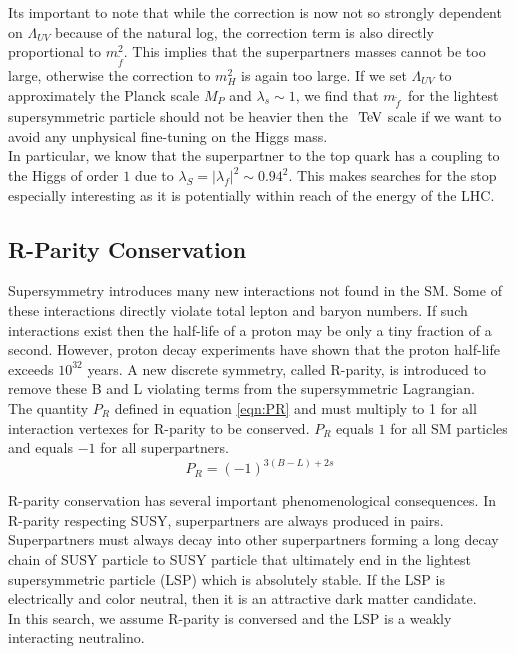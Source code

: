 \indent Its important to note that while the correction is now not so strongly dependent on $\Lambda_{UV}$ because of the natural log, the correction term is also directly proportional to $m_{\tilde{f}}^2$.  This implies that the superpartners masses cannot be too large, otherwise the correction to $m_H^2$ is again too large.  If we set $\Lambda_{UV}$ to approximately the Planck scale $M_P$ and $\lambda_s \sim 1$, we find that $m_{\tilde{f}}$~for the lightest supersymmetric particle should not be heavier then the $\tev$ scale if we want to avoid any unphysical fine-tuning on the Higgs mass.\cite{MartinSUSY}  \\

\indent In particular, we know that the superpartner to the top quark has a coupling to the Higgs of order $1$ due to $\lambda_S = |\lambda_f|^2 \sim 0.94^2$. This makes searches for the stop especially interesting as it is potentially within reach of the energy of the LHC. \\

\subsection{R-Parity Conservation}

\indent Supersymmetry introduces many new interactions not found in the SM.  Some of these interactions directly violate total lepton and baryon numbers.  If such interactions exist then the half-life of a proton may be only a tiny fraction of a second.  However, proton decay experiments have shown that the proton half-life exceeds $10^{32}$ years.  A new discrete symmetry, called R-parity, is introduced to remove these B and L violating terms from the supersymmetric Lagrangian.  \\

\indent The quantity $P_R$ defined in equation \ref{eqn:PR} and must multiply to 1 for all interaction vertexes for R-parity to be conserved. $P_R$ equals $1$ for all SM particles and equals $-1$ for all superpartners.  \\

\begin{equation}
\label{eqn:PR}
P_R = (-1)^{3(B-L)+2s}
\end{equation}

\indent R-parity conservation has several important phenomenological consequences.  In R-parity respecting SUSY, superpartners are always produced in pairs.  Superpartners must always decay into other superpartners forming a long decay chain of SUSY particle to SUSY particle that ultimately end in the lightest supersymmetric particle (LSP) which is absolutely stable.  If the LSP is electrically and color neutral, then it is an attractive dark matter candidate.  \\

\indent In this search, we assume R-parity is conversed and the LSP is a weakly interacting neutralino.  \\

